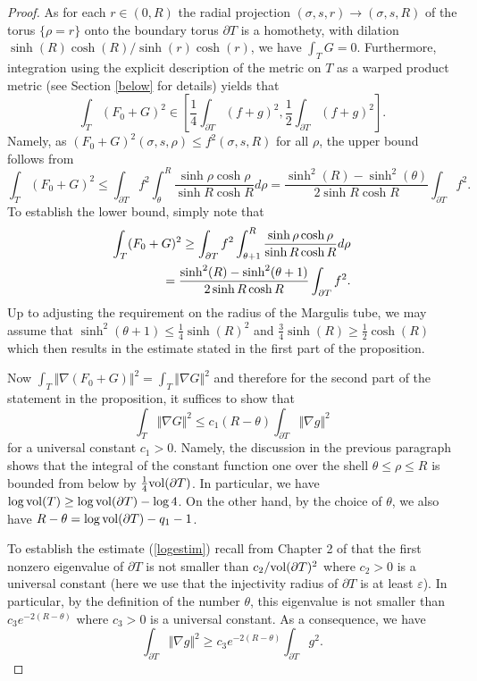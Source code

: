 \documentclass[11pt]{amsart}
\theoremstyle{plain}
\theoremstyle{plain}
\theoremstyle{definition}
\renewcommand{\epsilon}{\varepsilon}
\begin{document}
\begin{proof}
As for each $r\in (0, R)$ 
the radial projection $(\sigma,s,r)\to (\sigma,s,R)$ 
of the torus $\{\rho =r\}$ onto the boundary torus $\partial T$ 
is a homothety, with dilation
$\sinh(R)\cosh(R)/\sinh(r)\cosh(r)$, we have $\int_TG =0$. 
Furthermore, 
integration using the explicit description of the metric on $T$
as a warped product metric (see Section \ref{below} for details) yields that
\begin{equation}\label{squarenorm}
\int_T (F_0+G)^2\in [\frac{1}{4}\int_{\partial T} (f+g)^2,\frac{1}{2}\int_{\partial T}(f+g)^2].
\end{equation}
Namely, as $(F_0+G)^2(\sigma,s,\rho)\leq f^2(\sigma,s,R)$ for all $\rho$, 
the upper bound follows from
\[\int_T(F_0+G)^2\leq \int_{\partial T}f^2\int_\theta^R\frac{\sinh \rho \cosh \rho}{\sinh R\cosh R}d\rho
=\frac{\sinh^2(R)-\sinh^2(\theta)}{2\sinh R\cosh R}\int_{\partial T}f^2.\]
To establish the lower bound, simply note that
\begin{align}
\int_T(F_0+G)^2\geq \int_{\partial T}f^2\int_{\theta+1}^R 
\frac{\sinh \rho \cosh \rho}{\sinh R\cosh R}d\rho\notag\\
=\frac{\sinh^2(R)-\sinh^2 (\theta+1)}{2\sinh R\cosh R}\int_{\partial T}f^2.
\notag\end{align}
Up to adjusting the requirement on the radius of the Margulis tube, we may
assume that $\sinh^2(\theta +1)\leq \frac{1}{4} \sinh(R)^2$ and
$\frac{3}{4}\sinh(R)\geq \frac{1}{2}\cosh(R)$
which then results in the 
estimate stated in the first part of the proposition. 

Now $\int_T\Vert \nabla(F_0+G)\Vert^2=\int_T\Vert \nabla G\Vert^2$
and therefore for the second part of the statement in the proposition, 
it suffices to show that
\begin{equation}\label{logestim}
  \int_T\Vert \nabla G\Vert^2\leq c_1(R-\theta) 
  \int_{\partial T}\Vert \nabla g\Vert^2\end{equation}
for a universal 
constant $c_1>0$. Namely, the discussion in the previous paragraph shows
that the integral of the constant function one over the shell
$\theta\leq \rho\leq R$ is bounded from below by 
$\frac{1}{4}{\rm vol}(\partial T)$. In particular, we have 
$\log{\rm vol}(T)\geq \log {\rm vol}(\partial T)-\log 4$. 
On the other hand, by the choice of 
$\theta$, we also have $R-\theta=\log{\rm vol}(\partial T)-q_1-1$. 

To establish the estimate (\ref{logestim})
recall from Chapter 2 of \cite{C84} that the first 
nonzero eigenvalue of $\partial T$ is not smaller than
$c_2/{\rm vol}(\partial T)^2$ where $c_2>0$ is a universal constant
(here we use that the injectivity radius of $\partial T$ is at least $\epsilon$).
In particular, by the definition of the number $\theta$, this eigenvalue is 
not smaller than $c_3e^{-2(R-\theta)}$ where $c_3>0$ is a universal constant.
As a consequence, we have 
\begin{equation}\label{rayleighbd}
\int_{\partial T}\Vert \nabla g\Vert^2\geq c_3e^{-2(R-\theta)}\int_{\partial T}g^2.
\end{equation}


\end{proof}
\end{document}
